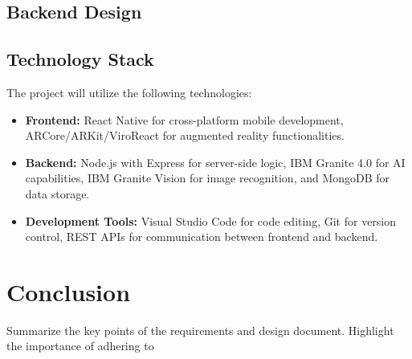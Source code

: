 \documentclass[12pt]{article}
\begin{document}
    \subsection{Backend Design}

        \subsubsection{}

        \subsubsection{}

        \subsubsection{}

    \subsection{Technology Stack}
        The project will utilize the following technologies:
        \begin{itemize}
            \item \textbf{Frontend:} React Native for cross-platform mobile development, ARCore/ARKit/ViroReact for augmented reality functionalities.
            \item \textbf{Backend:} Node.js with Express for server-side logic, IBM Granite 4.0 for AI capabilities, IBM Granite Vision for image recognition, and MongoDB for data storage.
            \item \textbf{Development Tools:} Visual Studio Code for code editing, Git for version control, REST APIs for communication between frontend and backend.
        \end{itemize}

\section{Conclusion}
Summarize the key points of the requirements and design document. Highlight the importance of adhering to
\end{document}
